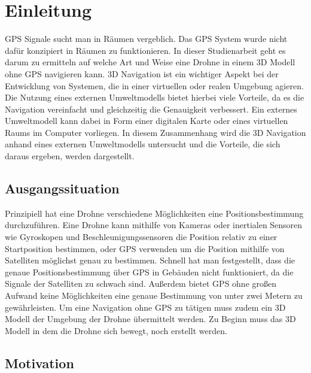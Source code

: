 \chapter{Einleitung}

\ac{GPS} Signale sucht man in Räumen vergeblich. Das \ac{GPS} System wurde nicht dafür konzipiert in Räumen zu funktionieren.
In dieser Studienarbeit geht es darum zu ermitteln auf welche Art und Weise eine Drohne in einem 3D Modell ohne \ac{GPS} navigieren kann.
3D Navigation ist ein wichtiger Aspekt bei der Entwicklung von Systemen, die in einer virtuellen oder realen Umgebung agieren. Die Nutzung eines externen Umweltmodells bietet hierbei viele Vorteile, da es die Navigation vereinfacht und gleichzeitig die Genauigkeit verbessert. Ein externes Umweltmodell kann dabei in Form einer digitalen Karte oder eines virtuellen Raums im Computer vorliegen. In diesem Zusammenhang wird die 3D Navigation anhand eines externen Umweltmodells untersucht und die Vorteile, die sich daraus ergeben, werden dargestellt.



\section{Ausgangssituation}

Prinzipiell hat eine Drohne verschiedene Möglichkeiten eine Positionsbestimmung durchzuführen.
Eine Drohne kann mithilfe von Kameras oder inertialen Sensoren wie Gyroskopen und Beschleunigungssensoren die Position relativ zu einer Startposition bestimmen, oder \ac{GPS} verwenden um die Position mithilfe von Satelliten möglichst genau zu bestimmen.
Schnell hat man festgestellt, dass die genaue Positionsbestimmung über \ac{GPS} in Gebäuden nicht funktioniert, da die Signale der Satelliten zu schwach sind. Außerdem bietet \ac{GPS} ohne großen Aufwand keine Möglichkeiten eine genaue Bestimmung von unter zwei Metern zu gewährleisten.
Um eine Navigation ohne GPS zu tätigen muss zudem ein 3D Modell der Umgebung der Drohne übermittelt werden.
Zu Beginn muss das 3D Modell in dem die Drohne sich bewegt, noch erstellt werden.


\section{Motivation}


